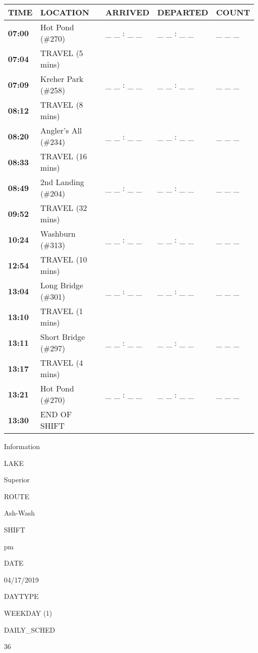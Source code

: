 \documentclass[]{article}
\begin{document}
\begin{tabular}{>{\bfseries}lllll}
\toprule
\textbf{TIME} & \textbf{LOCATION} & \textbf{ARRIVED} & \textbf{DEPARTED} & \textbf{COUNT}\\
\midrule
07:00 & Hot Pond (\#270) & \_ \_ : \_ \_ & \_ \_ : \_ \_ & \_ \_ \_\\
07:04 & TRAVEL (5 mins) &  &  & \\
07:09 & Kreher Park (\#258) & \_ \_ : \_ \_ & \_ \_ : \_ \_ & \_ \_ \_\\
08:12 & TRAVEL (8 mins) &  &  & \\
08:20 & Angler's All (\#234) & \_ \_ : \_ \_ & \_ \_ : \_ \_ & \_ \_ \_\\
08:33 & TRAVEL (16 mins) &  &  & \\
08:49 & 2nd Landing (\#204) & \_ \_ : \_ \_ & \_ \_ : \_ \_ & \_ \_ \_\\
09:52 & TRAVEL (32 mins) &  &  & \\
10:24 & Washburn (\#313) & \_ \_ : \_ \_ & \_ \_ : \_ \_ & \_ \_ \_\\
12:54 & TRAVEL (10 mins) &  &  & \\
13:04 & Long Bridge (\#301) & \_ \_ : \_ \_ & \_ \_ : \_ \_ & \_ \_ \_\\
13:10 & TRAVEL (1 mins) &  &  & \\
13:11 & Short Bridge (\#297) & \_ \_ : \_ \_ & \_ \_ : \_ \_ & \_ \_ \_\\
13:17 & TRAVEL (4 mins) &  &  & \\
13:21 & Hot Pond (\#270) & \_ \_ : \_ \_ & \_ \_ : \_ \_ & \_ \_ \_\\
13:30 & END OF SHIFT &  &  & \\
\bottomrule
\end{tabular}\newpage

Information

LAKE

Superior

ROUTE

Ash-Wash

SHIFT

pm

DATE

04/17/2019

DAYTYPE

WEEKDAY (1)

DAILY\_SCHED

36

\vspace{24pt}
\end{document}
